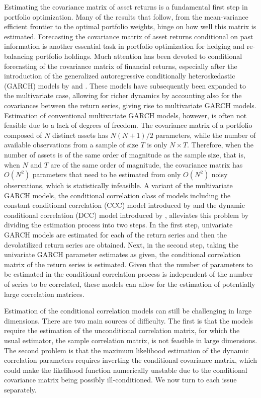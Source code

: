Estimating the covariance matrix of asset returns is a fundamental first step in portfolio optimization. Many of the results that follow, from the mean-variance efficient frontier to the optimal portfolio weights, hinge on how well this matrix is estimated. Forecasting the covariance matrix of asset returns conditional on past information is another essential task in portfolio optimization for hedging and re-balancing portfolio holdings. Much attention has been devoted to conditional forecasting of the covariance matrix of financial returns, especially after the introduction of the generalized autoregressive conditionally heteroskedastic (GARCH) models by \textcite{ENGLE1982} and \textcite{BOLLERSLEV1986}. These models have subsequently been expanded to the multivariate case, allowing for richer dynamics by accounting also for the covariances between the return series, giving rise to multivariate GARCH models. Estimation of conventional multivariate GARCH models, however, is often not feasible due to a lack of degrees of freedom. The covariance matrix of a portfolio composed of $N$ distinct assets has $N(N+1)/2$ parameters, while the number of available observations from a sample of size $T$ is only $N \times T$. Therefore, when the number of assets is of the same order of magnitude as the sample size, that is, when $N$ and $T$ are of the same order of magnitude, the covariance matrix has $O(N^2)$ parameters that need to be estimated from only $O(N^2)$ noisy observations, which is statistically infeasible. A variant of the multivariate GARCH models, the conditional correlation class of models including the constant conditional correlation (CCC) model introduced by \textcite{BOLLERSLEV1990} and the dynamic conditional correlation (DCC) model introduced by \textcite{ENGLE2002}, alleviates this problem by dividing the estimation process into two steps. In the first step, univariate GARCH models are estimated for each of the return series and then the devolatilized return series are obtained. Next, in the second step, taking the univariate GARCH parameter estimates as given, the conditional correlation matrix of the return series is estimated. Given that the number of parameters to be estimated in the conditional correlation process is independent of the number of series to be correlated, these models can allow for the estimation of potentially large correlation matrices.

Estimation of the conditional correlation models can still be challenging in large dimensions. There are two main sources of difficulty. The first is that the models require the estimation of the unconditional correlation matrix, for which the usual estimator, the sample correlation matrix, is not feasible in large dimensions. The second problem is that the maximum likelihood estimation of the dynamic correlation parameters requires inverting the conditional covariance matrix, which could make the likelihood function numerically unstable due to the conditional covariance matrix being possibly ill-conditioned. We now turn to each issue separately.

